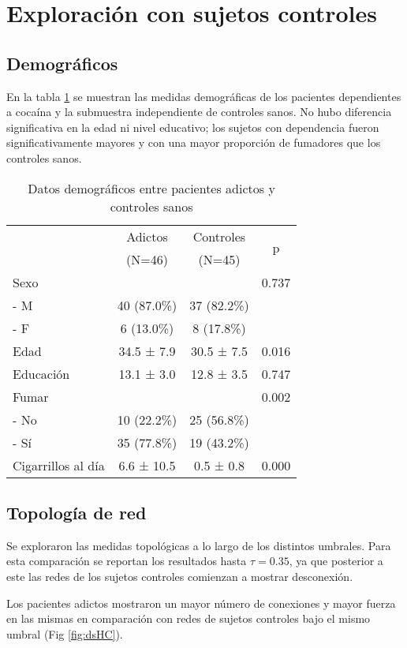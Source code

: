 \section{Exploración con sujetos controles}
\subsection{Demográficos}

En la tabla \ref{tab:demHC} se muestran las medidas demográficas de los pacientes dependientes a cocaína y la submuestra independiente de controles sanos.
No hubo diferencia significativa en la edad ni nivel educativo; los sujetos con dependencia fueron significativamente mayores y con una mayor proporción de fumadores que los controles sanos.

\begin{table}[hbp]
    \centering
    \small
    \caption{Datos demográficos entre pacientes adictos y controles sanos}
    \label{tab:demHC}
    \begin{tabular}{lccc}
        \hline
        & Adictos & Controles & \multirow{2}{*}{p}\\
        & (N=46) & (N=45) & \\
        \hline
        Sexo            &  &  & 0.737\\
        - M           & 40 (87.0\%) & 37 (82.2\%) & \\
        - F           & 6 (13.0\%) & 8 (17.8\%) & \\
        Edad            & 34.5 ±  7.9 & 30.5 ±  7.5 & 0.016\\
        Educación       & 13.1 ±  3.0 & 12.8 ±  3.5 & 0.747\\
        Fumar           &  &  & 0.002\\
        - No          & 10 (22.2\%) & 25 (56.8\%) & \\
        - Sí          & 35 (77.8\%) & 19 (43.2\%) & \\
        Cigarrillos al día &  6.6 ± 10.5 &  0.5 ±  0.8 & 0.000\\
        \hline
    \end{tabular}
\end{table}

\subsection{Topología de red}
Se exploraron las medidas topológicas a lo largo de los distintos umbrales.
Para esta comparación se reportan los resultados hasta $\tau = 0.35$, ya que posterior a este las redes de los sujetos controles comienzan a mostrar desconexión.\par
Los pacientes adictos mostraron un mayor número de conexiones y mayor fuerza en las mismas en comparación con redes de sujetos controles
bajo el mismo umbral (Fig \ref{fig:dsHC}).

